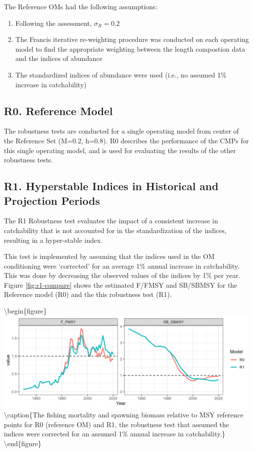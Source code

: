 \documentclass[
]{article}
\providecommand{\tightlist}{%
  \setlength{\itemsep}{0pt}\setlength{\parskip}{0pt}}
\begin{document}
The Reference OMs had the following assumptions:

\begin{enumerate}
\def\labelenumi{\arabic{enumi}.}
\tightlist
\item
  Following the assessment, \(\sigma_R = 0.2\)
\item
  The Francis iterative re-weighting procedure was conducted on each operating model to find the appropriate weighting between the length compostion data and the indices of abundance
\item
  The standardized indices of abundance were used (i.e., no assumed 1\% increase in catchability)
\end{enumerate}

\hypertarget{r0.-reference-model}{%
\subsection{R0. Reference Model}\label{r0.-reference-model}}

The robustness tests are conducted for a single operating model from center of the Reference Set (M=0.2, h=0.8). R0 describes the performance of the CMPs for this single operating model, and is used for evaluating the results of the other robustness tests.

\hypertarget{r1.-hyperstable-indices-in-historical-and-projection-periods}{%
\subsection{R1. Hyperstable Indices in Historical and Projection Periods}\label{r1.-hyperstable-indices-in-historical-and-projection-periods}}

The R1 Robustness test evaluates the impact of a consistent increase in catchability that is not accounted for in the standardization of the indices, resulting in a hyper-stable index.

This test is implemented by assuming that the indices used in the OM conditioning were `corrected' for an average 1\% annual increase in catchability. This was done by decreasing the observed values of the indices by 1\% per year. Figure \ref{fig:r1-compare} shows the estimated F/FMSY and SB/SBMSY for the Reference model (R0) and the this robustness test (R1).

\textbackslash begin\{figure\}
\includegraphics[width=33.33in]{../../img/R1_Increasing_q/Compare} \textbackslash caption\{The fishing mortality and spawning biomass relative to MSY reference points for R0 (reference OM) and R1, the robustness test that assumed the indices were corrected for an assumed 1\% annual increase in catchability.\}\label{fig:r1-compare}
\textbackslash end\{figure\}
\end{document}
